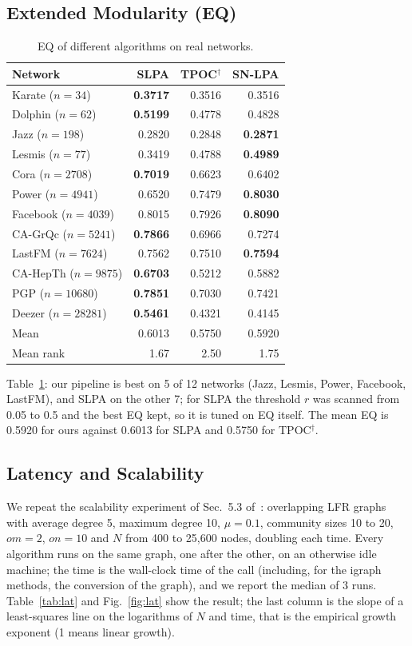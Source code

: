 \documentclass[conference]{IEEEtran}
\begin{document}
\subsection{Extended Modularity (EQ)}
\begin{table}[H]
\centering
\caption{EQ of different algorithms on real networks.}
\label{tab:eq}
\scriptsize
\begin{tabular}{lrrr}
\toprule
Network & SLPA & TPOC$^{\dagger}$ & SN-LPA \\
\midrule
Karate ($n{=}34$) & \textbf{0.3717} & 0.3516 & 0.3516 \\
Dolphin ($n{=}62$) & \textbf{0.5199} & 0.4778 & 0.4828 \\
Jazz ($n{=}198$) & 0.2820 & 0.2848 & \textbf{0.2871} \\
Lesmis ($n{=}77$) & 0.3419 & 0.4788 & \textbf{0.4989} \\
Cora ($n{=}2708$) & \textbf{0.7019} & 0.6623 & 0.6402 \\
Power ($n{=}4941$) & 0.6520 & 0.7479 & \textbf{0.8030} \\
Facebook ($n{=}4039$) & 0.8015 & 0.7926 & \textbf{0.8090} \\
CA-GrQc ($n{=}5241$) & \textbf{0.7866} & 0.6966 & 0.7274 \\
LastFM ($n{=}7624$) & 0.7562 & 0.7510 & \textbf{0.7594} \\
CA-HepTh ($n{=}9875$) & \textbf{0.6703} & 0.5212 & 0.5882 \\
PGP ($n{=}10680$) & \textbf{0.7851} & 0.7030 & 0.7421 \\
Deezer ($n{=}28281$) & \textbf{0.5461} & 0.4321 & 0.4145 \\
\midrule
Mean & 0.6013 & 0.5750 & 0.5920 \\
Mean rank & 1.67 & 2.50 & 1.75 \\
\bottomrule
\end{tabular}
\end{table}
Table~\ref{tab:eq}: our pipeline is best on 5 of 12 networks (Jazz, Lesmis, Power, Facebook, LastFM), and SLPA on the other 7; for SLPA the threshold $r$ was scanned from 0.05 to 0.5 and the best EQ kept, so it is tuned on EQ itself. The mean EQ is 0.5920 for ours against 0.6013 for SLPA and 0.5750 for TPOC$^{\dagger}$.

\subsection{Latency and Scalability}\label{sec:latency}
We repeat the scalability experiment of Sec.~5.3 of~\cite{kong2026}: overlapping LFR graphs with average degree 5, maximum degree 10, $\mu{=}0.1$, community sizes 10 to 20, $om{=}2$, $on{=}10$ and $N$ from 400 to 25,600 nodes, doubling each time. Every algorithm runs on the same graph, one after the other, on an otherwise idle machine; the time is the wall-clock time of the call (including, for the igraph methods, the conversion of the graph), and we report the median of 3 runs. Table~\ref{tab:lat} and Fig.~\ref{fig:lat} show the result; the last column is the slope of a least-squares line on the logarithms of $N$ and time, that is the empirical growth exponent (1 means linear growth).
\end{document}
